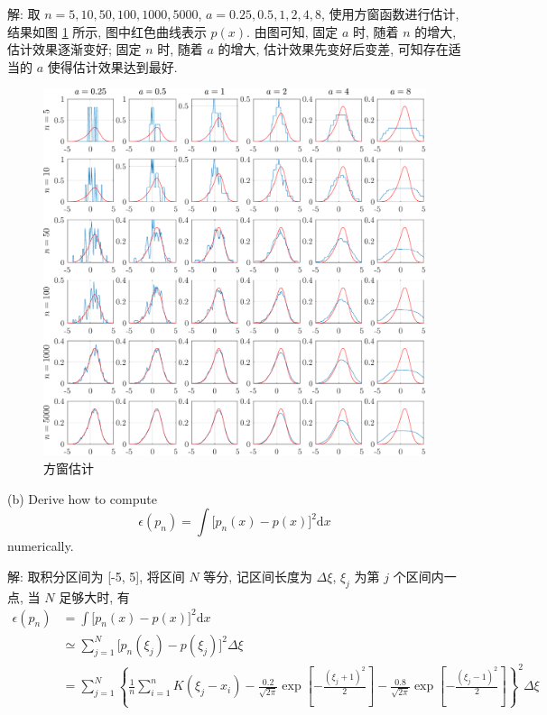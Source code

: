\documentclass{article}
\begin{document}
解: 取 $n=5,10,50,100,1000,5000$, $a=0.25,0.5,1,2,4,8$, 使用方窗函数进行估计, 结果如图 \ref{fig:sqwin} 所示, 图中红色曲线表示 $p(x)$. 由图可知, 固定 $a$ 时, 随着 $n$ 的增大, 估计效果逐渐变好; 固定 $n$ 时, 随着 $a$ 的增大, 估计效果先变好后变差, 可知存在适当的 $a$ 使得估计效果达到最好.

\begin{figure}[htbp]
  \centering
  \includegraphics[width=7in]{squareWindow.pdf}
  \caption{方窗估计}
  \label{fig:sqwin}
\end{figure}

(b) Derive how to compute
\begin{equation}
  \epsilon(p_n)=\int\big[p_n(x)-p(x)\big]^2\mathrm{d}x
\end{equation}
numerically.

解: 取积分区间为 [-5, 5], 将区间 $N$ 等分, 记区间长度为 $\Delta \xi$, $\xi_j$ 为第 $j$ 个区间内一点, 当 $N$ 足够大时, 有
\begin{equation}
  \begin{aligned}
    \epsilon(p_n)
    &=\int\big[p_n(x)-p(x)\big]^2\mathrm{d}x\\
    &\simeq\sum_{j=1}^N\big[p_n(\xi_j)-p(\xi_j)\big]^2\Delta \xi\\
    &=\sum_{j=1}^N\left\{\frac{1}{n}\sum_{i=1}^nK(\xi_j-x_i)-\frac{0.2}{\sqrt{2\pi}}\exp\left[-\frac{(\xi_j+1)^2}{2}\right]-\frac{0.8}{\sqrt{2\pi}}\exp\left[-\frac{(\xi_j-1)^2}{2}\right]\right\}^2\Delta \xi\\
  \end{aligned}
\end{equation}
\end{document}
